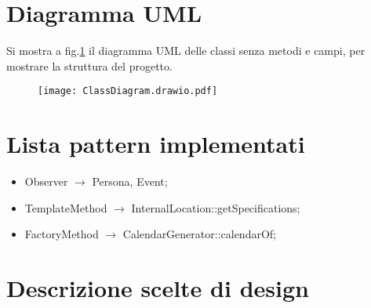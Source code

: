 \documentclass[a4paper,11pt]{article}
\begin{document}
	\section{Diagramma UML}
	Si mostra a fig.\ref{classdiagram} il diagramma UML delle classi senza metodi e campi, per mostrare la struttura del progetto.
	
	\begin{figure}[htb!]
		\noindent\texttt{[image: ClassDiagram.drawio.pdf]}
		\label{classdiagram}
	\end{figure}
	\section{Lista pattern implementati}
	\begin{itemize}
		\item Observer $\rightarrow$ Persona, Event;
		\item TemplateMethod $\rightarrow$ InternalLocation::getSpecifications;
		\item FactoryMethod $\rightarrow$ CalendarGenerator::calendarOf;
	\end{itemize}
	\section{Descrizione scelte di design}
\end{document}
